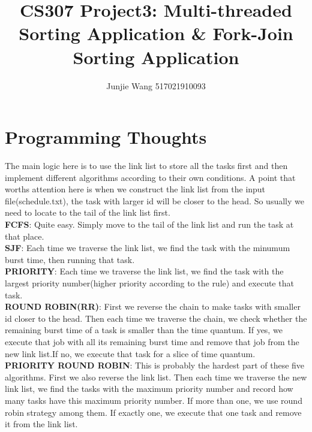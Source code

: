 \documentclass[12pt]{extarticle}
\title{CS307 Project3: Multi-threaded Sorting Application \& Fork-Join Sorting Application}
\author{Junjie Wang 517021910093}
\newcommand{\<}{\langle}
\renewcommand{\>}{\rangle}
\theoremstyle{definition}
\begin{document}
	\maketitle
	\section{Programming Thoughts}
	The main logic here is to use the link list to store all the tasks first and then implement different algorithms according to their own conditions. A point that worths attention here is when we construct the link list from the input file(schedule.txt), the task with larger id will be closer to the head. So usually we need to locate to the tail of the link list first.\\
	\textbf{FCFS}: Quite easy. Simply move to the tail of the link list and run the task at that place. \\
	\textbf{SJF}: Each time we traverse the link list, we find the task with the minumum burst time, then running that task. \\
	\textbf{PRIORITY}: Each time we traverse the link list, we find the task with the largest priority number(higher priority according to the rule) and execute that task. \\
	\textbf{ROUND ROBIN(RR)}: First we reverse the chain to make tasks with smaller id closer to the head. Then each time we traverse the chain, we check whether the remaining burst time of a task is smaller than the time quantum. If yes, we execute that job with all its remaining burst time and remove that job from the new link list.If no, we execute that task for a slice of time quantum. \\
	\textbf{PRIORITY ROUND ROBIN}: This is probably the hardest part of these five algorithms. First we also reverse the link list. Then each time we traverse the new link list, we find the tasks with the maximum priority number and record how many tasks have this maximum priority number. If more than one, we use round robin strategy among them. If exactly one, we execute that one task and remove it from the link list.
\end{document}
